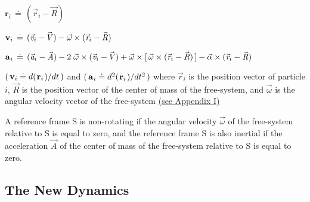 \documentclass[10pt]{article}
\begin{document}
\par \bigskip\smallskip ${\mathbf{r}}_i \,\doteq\, ({\vec{\mathit{r}}}_i - {\vec{\mathit{R}}})$

\par \bigskip ${\mathbf{v}}_i \,\doteq\, ({\vec{\mathit{v}}}_i - \hspace{-0.120em}{\vec{\mathit{V}}}) - {\vec{\omega}} \times ({\vec{\mathit{r}}}_i - {\vec{\mathit{R}}})$

\par \bigskip ${\mathbf{a}}_{\hspace{+0.045em}i} \,\doteq\, ({\vec{\mathit{a}}}_i - {\vec{\mathit{A}}}) - 2 \; {\vec{\omega}} \times ({\vec{\mathit{v}}}_i - \hspace{-0.120em}{\vec{\mathit{V}}}) + {\vec{\omega}} \times [ \, {\vec{\omega}} \times ({\vec{\mathit{r}}}_i - {\vec{\mathit{R}}}) \, ] - {\vec{\alpha}} \times ({\vec{\mathit{r}}}_i - {\vec{\mathit{R}}})$

\par \bigskip\smallskip \noindent $( \, {\mathbf{v}}_i \doteq d(\hspace{+0.090em}{\mathbf{r}}_i\hspace{+0.090em})/dt \, )$ and $( \, {\mathbf{a}}_{\hspace{+0.045em}i} \doteq d^2(\hspace{+0.090em}{\mathbf{r}}_i\hspace{+0.090em})/dt^2 \, )$ where ${\vec{\mathit{r}}}_i$ is the position vector of particle $i$, ${\vec{\mathit{R}}}$ is the position vector of the center of mass of the free-system, and ${\vec{\omega}}$ is the angular velocity vector of the free-system \hyperlink{p3a1}{(\hspace{+0.120em}see Appendix I\hspace{+0.120em})}

\par \bigskip \noindent A reference frame S is non-rotating if the angular velocity ${\vec{\omega}}$ of the free-system relative to S is equal to zero, and the reference frame S is also inertial if the acceleration ${\vec{\mathit{A}}}$ of the center of mass of the free-system relative to S is equal to zero.

\vspace{+1.20em}

\par {\centering\subsection*{The New Dynamics}}
\end{document}
